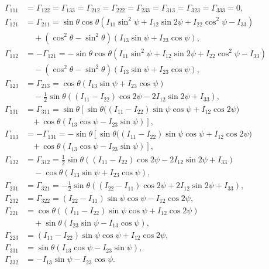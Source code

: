 \documentclass[pdflatex,sn-mathphys-num]{sn-jnl}%
\theoremstyle{thmstyleone}%
\theoremstyle{thmstyletwo}%
\theoremstyle{thmstylethree}%
\begin{document}
\begin{appendices}
\begin{align}
\Gamma_{111} &= \Gamma_{122} = \Gamma_{133} = \Gamma_{212} = \Gamma_{222}
= \Gamma_{233} = \Gamma_{313} = \Gamma_{323} = \Gamma_{333} = 0, \nonumber \\[6pt]
%
\Gamma_{121} &= \Gamma_{211} =
\sin\theta \cos\theta \left(I_{11} \sin^2\psi + I_{12} \sin 2\psi + I_{22} \cos^2\psi - I_{33}\right) \nonumber \\
&\quad + \left(\cos^2\theta - \sin^2\theta\right)(I_{13} \sin\psi + I_{23} \cos\psi), \nonumber \\[6pt]
%
\Gamma_{112} &= -\Gamma_{121} =
-\sin\theta \cos\theta \left(I_{11} \sin^2\psi + I_{12} \sin 2\psi + I_{22} \cos^2\psi - I_{33}\right) \nonumber \\
&\quad - \left(\cos^2\theta - \sin^2\theta\right)(I_{13} \sin\psi + I_{23} \cos\psi), \nonumber \\[6pt]
%
\Gamma_{123} &= \Gamma_{213} =
\cos\theta (I_{13} \sin\psi + I_{23} \cos\psi) \nonumber \\
&\quad - \tfrac12 \sin\theta \left((I_{11} - I_{22}) \cos 2\psi - 2 I_{12} \sin 2\psi + I_{33}\right), \nonumber \\[6pt]
%
\Gamma_{131} &= \Gamma_{311} =
\sin\theta \left[\sin\theta \big((I_{11} - I_{22}) \sin\psi \cos\psi + I_{12} \cos 2\psi\big) \right. \nonumber \\
&\quad \left. +\, \cos\theta (I_{13} \cos\psi - I_{23} \sin\psi)\right], \nonumber \\[6pt]
%
\Gamma_{113} &= -\Gamma_{131} =
-\sin\theta \left[\sin\theta \big((I_{11} - I_{22}) \sin\psi \cos\psi + I_{12} \cos 2\psi\big) \right. \nonumber \\
&\quad \left. +\, \cos\theta (I_{13} \cos\psi - I_{23} \sin\psi)\right], \nonumber \\[6pt]
%
\Gamma_{132} &= \Gamma_{312} =
\tfrac12 \sin\theta \left((I_{11} - I_{22}) \cos 2\psi - 2 I_{12} \sin 2\psi + I_{33}\right) \nonumber \\
&\quad - \cos\theta (I_{13} \sin\psi + I_{23} \cos\psi), \nonumber \\[6pt]
%
\Gamma_{231} &= \Gamma_{321} =
-\tfrac12 \sin\theta \left((I_{22} - I_{11}) \cos 2\psi + 2 I_{12} \sin 2\psi + I_{33}\right), \nonumber \\[6pt]
%
\Gamma_{232} &= \Gamma_{322} =
(I_{22} - I_{11}) \sin\psi \cos\psi - I_{12} \cos 2\psi, \nonumber \\[6pt]
%
\Gamma_{221} &=
\cos\theta \left((I_{11} - I_{22}) \sin\psi \cos\psi + I_{12} \cos 2\psi\right) \nonumber \\
&\quad + \sin\theta (I_{23} \sin\psi - I_{13} \cos\psi), \nonumber \\[6pt]
%
\Gamma_{223} &=
(I_{11} - I_{22}) \sin\psi \cos\psi + I_{12} \cos 2\psi, \nonumber \\[6pt]
%
\Gamma_{331} &=
\sin\theta (I_{13} \cos\psi - I_{23} \sin\psi), \nonumber \\[6pt]
%
\Gamma_{332} &=
- I_{13} \sin\psi - I_{23} \cos\psi.
\end{align}



\end{appendices}
\end{document}
